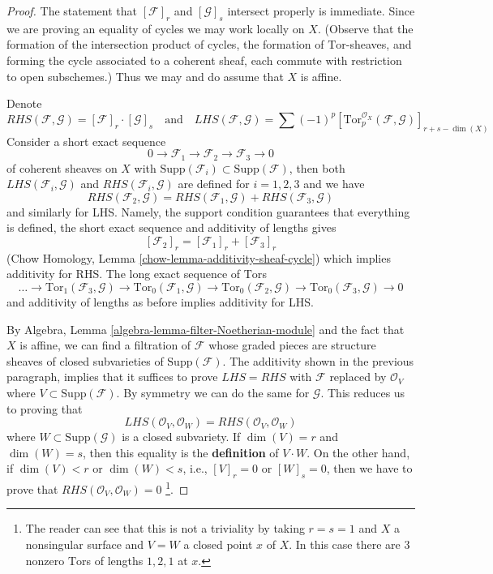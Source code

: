 \documentclass{stacks-project}
\theoremstyle{plain}
\theoremstyle{definition}
\theoremstyle{remark}
\numberwithin{equation}{subsection}
\begin{document}
\begin{proof}
The statement that $[\mathcal{F}]_r$ and $[\mathcal{G}]_s$ intersect properly
is immediate. Since we are proving an equality of cycles we may work
locally on $X$. (Observe that the formation of the intersection
product of cycles, the formation of $\text{Tor}$-sheaves, and
forming the cycle associated to a coherent sheaf, each commute with
restriction to open subschemes.) Thus we may and do assume that $X$ is affine.

\medskip\noindent
Denote
$$
RHS(\mathcal{F}, \mathcal{G}) = [\mathcal{F}]_r \cdot [\mathcal{G}]_s
\quad\text{and}\quad
LHS(\mathcal{F}, \mathcal{G}) = \sum (-1)^p
[\text{Tor}_p^{\mathcal{O}_X}(\mathcal{F}, \mathcal{G})]_{r + s - \dim(X)}
$$
Consider a short exact sequence
$$
0 \to \mathcal{F}_1 \to \mathcal{F}_2 \to \mathcal{F}_3 \to 0
$$
of coherent sheaves on $X$ with
$\text{Supp}(\mathcal{F}_i) \subset \text{Supp}(\mathcal{F})$,
then both $LHS(\mathcal{F}_i, \mathcal{G})$ and
$RHS(\mathcal{F}_i, \mathcal{G})$ are defined for $i = 1, 2, 3$
and we have
$$
RHS(\mathcal{F}_2, \mathcal{G}) =
RHS(\mathcal{F}_1, \mathcal{G}) + RHS(\mathcal{F}_3, \mathcal{G})
$$
and similarly for LHS. Namely, the support condition guarantees that
everything is defined, the short exact sequence and additivity of lengths
gives
$$
[\mathcal{F}_2]_r = [\mathcal{F}_1]_r  + [\mathcal{F}_3]_r
$$
(Chow Homology, Lemma \ref{chow-lemma-additivity-sheaf-cycle})
which implies additivity for RHS. The long exact sequence of $\text{Tor}$s
$$
\ldots \to \text{Tor}_1(\mathcal{F}_3, \mathcal{G}) \to
\text{Tor}_0(\mathcal{F}_1, \mathcal{G}) \to
\text{Tor}_0(\mathcal{F}_2, \mathcal{G}) \to
\text{Tor}_0(\mathcal{F}_3, \mathcal{G}) \to 0
$$
and additivity of lengths as before implies additivity for LHS.

\medskip\noindent
By Algebra, Lemma \ref{algebra-lemma-filter-Noetherian-module}
and the fact that $X$ is affine, we can find a filtration of $\mathcal{F}$
whose graded pieces are structure sheaves of closed subvarieties of
$\text{Supp}(\mathcal{F})$. The additivity shown in the previous paragraph,
implies that it suffices to prove $LHS = RHS$ with
$\mathcal{F}$ replaced by $\mathcal{O}_V$ where
$V \subset \text{Supp}(\mathcal{F})$.
By symmetry we can do the same for $\mathcal{G}$.
This reduces us to proving that
$$
LHS(\mathcal{O}_V, \mathcal{O}_W) = RHS(\mathcal{O}_V, \mathcal{O}_W)
$$
where $W \subset \text{Supp}(\mathcal{G})$ is a closed subvariety.
If $\dim(V) = r$ and $\dim(W) = s$, then this equality is the
{\bf definition} of $V \cdot W$. On the other hand, if
$\dim(V) < r$ or $\dim(W) < s$, i.e., $[V]_r = 0$ or $[W]_s = 0$,
then we have to prove that $RHS(\mathcal{O}_V, \mathcal{O}_W) = 0$
\footnote{The reader can see that this is not a triviality by
taking $r = s = 1$ and $X$ a nonsingular surface and $V = W$
a closed point $x$ of $X$. In this case there are $3$ nonzero
$\text{Tor}$s of lengths $1, 2, 1$ at $x$.}.


\end{proof}
\end{document}
